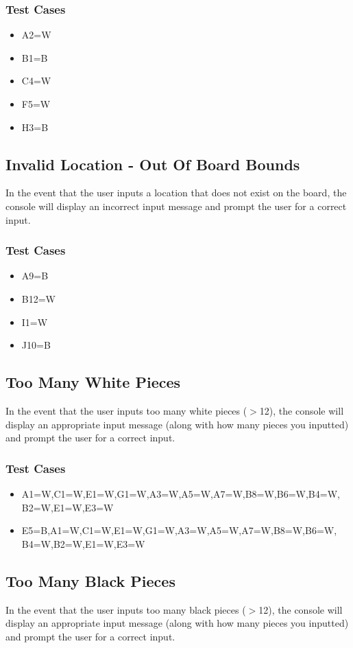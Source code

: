 \documentclass{article}
\begin{document}
\subsubsection*{Test Cases}
\begin{itemize}
\item A2=W
\item B1=B
\item C4=W
\item F5=W
\item H3=B
\end{itemize}

\subsection{Invalid Location - Out Of Board Bounds}
In the event that the user inputs a location that does not exist on the board, the console will display an incorrect input message and prompt the user for a correct input.

\subsubsection*{Test Cases}
\begin{itemize}
\item A9=B
\item B12=W
\item I1=W
\item J10=B
\end{itemize}

\subsection{Too Many White Pieces}
In the event that the user inputs too many white pieces ($>$12), the console will display an appropriate input message (along with how many pieces you inputted) and prompt the user for a correct input.

\subsubsection*{Test Cases}
\begin{itemize}
\item A1=W,C1=W,E1=W,G1=W,A3=W,A5=W,A7=W,B8=W,B6=W,B4=W,
B2=W,E1=W,E3=W
\item E5=B,A1=W,C1=W,E1=W,G1=W,A3=W,A5=W,A7=W,B8=W,B6=W,
B4=W,B2=W,E1=W,E3=W
\end{itemize}

\subsection{Too Many Black Pieces}
In the event that the user inputs too many black pieces ($>$12), the console will display an appropriate input message (along with how many pieces you inputted) and prompt the user for a correct input.
\end{document}
